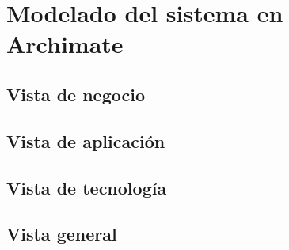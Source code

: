 \label{cap:disenio}

\section{Modelado del sistema en Archimate}


\subsection{Vista de negocio}


\subsection{Vista de aplicación}


\subsection{Vista de tecnología}



\subsection{Vista general}
